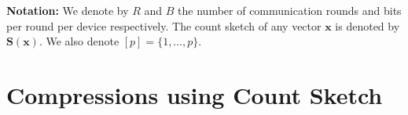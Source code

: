 \documentclass[twoside]{article}
\begin{document}



\vspace{0.05in}\noindent\textbf{Notation:} 
We denote by $R$ and $B$ the number of communication rounds and bits per round per device respectively. 
The count sketch of any vector $\boldsymbol{x}$ is denoted by $\mathbf{S}(\boldsymbol{x})$. We also denote $[p] =\{1,\dots,p\}$.

\vspace{-0.05in}
\section{Compressions using Count Sketch}\label{sec:compression}
\vspace{-0.05in}
\end{document}
